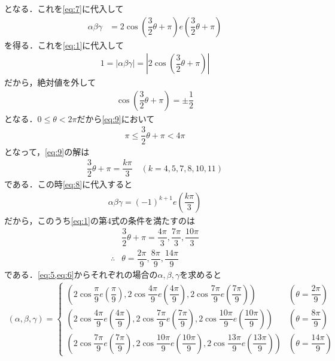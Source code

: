 \documentclass[../../main.tex]{subfiles}
\begin{document}
となる．これを\cref{eq:7}に代入して
\begin{align}
  \alpha\beta\gamma
  &= 2\cos \left(\dfrac{3}{2}\theta + \pi\right)e\left(\dfrac{3}{2}\theta + \pi\right) \label{eq:8}
\end{align}
を得る．これを\cref{eq:1}に代入して
\begin{align}
  1 = |\alpha\beta\gamma| = \left|2\cos \left(\dfrac{3}{2}\theta + \pi\right)\right|
\end{align}
だから，絶対値を外して
\begin{align}
  \cos \left(\dfrac{3}{2}\theta + \pi\right) = \pm \dfrac{1}{2} \label{eq:9}
\end{align}
となる．$0 \le \theta < 2\pi$だから\cref{eq:9}において
\begin{align}
  \pi \le \dfrac{3}{2}\theta + \pi < 4\pi
\end{align}
となって，\cref{eq:9}の解は
\begin{align}
  \dfrac{3}{2}\theta + \pi = \dfrac{k\pi}{3} \quad (k=4,5,7,8,10,11)
\end{align}
である．この時\cref{eq:8}に代入すると
\begin{align}
  \alpha\beta\gamma = (-1)^{k+1}e\left(\dfrac{k\pi}{3}\right)
\end{align}
だから，このうち\cref{eq:1}の第4式の条件を満たすのは
\begin{align}
  & \dfrac{3}{2}\theta + \pi = \dfrac{4\pi}{3}, \dfrac{7\pi}{3}, \dfrac{10\pi}{3} \\
  \therefore
  & \theta = \dfrac{2\pi}{9}, \dfrac{8\pi}{9}, \dfrac{14\pi}{9}
\end{align}
である．\cref{eq:5,eq:6}からそれぞれの場合の$\alpha,\beta,\gamma$を求めると
\begin{align}
  (\alpha,\beta,\gamma) =
  \begin{cases}
    \left(2 \cos \dfrac{\pi}{9} e\left(\dfrac{\pi}{9}\right),2 \cos \dfrac{4\pi}{9} e\left(\dfrac{4\pi}{9}\right),2 \cos \dfrac{7\pi}{9} e\left(\dfrac{7\pi}{9}\right)\right)
    & (\theta = \dfrac{2\pi}{9})\\
    \left(2 \cos \dfrac{4\pi}{9} e\left(\dfrac{4\pi}{9}\right),2 \cos \dfrac{7\pi}{9} e\left(\dfrac{7\pi}{9}\right),2 \cos \dfrac{10\pi}{9} e\left(\dfrac{10\pi}{9}\right)\right)
    & (\theta = \dfrac{8\pi}{9}) \\
    \left(2 \cos \dfrac{7\pi}{9} e\left(\dfrac{7\pi}{9}\right),2 \cos \dfrac{10\pi}{9} e\left(\dfrac{10\pi}{9}\right),2 \cos \dfrac{13\pi}{9} e\left(\dfrac{13\pi}{9}\right)\right)
    & (\theta = \dfrac{14\pi}{9})
  \end{cases}
\end{align}
\end{document}
